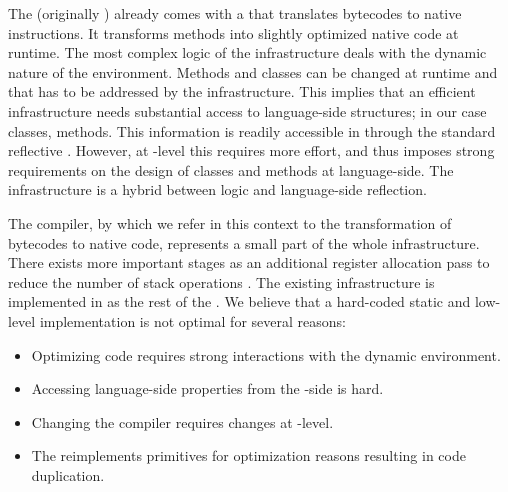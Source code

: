 \noindent The \PH \VM (originally ) already comes with a \JIT that translates bytecodes to native instructions.
It transforms \PH methods into slightly optimized native code at runtime.
The most complex logic of the \JIT infrastructure deals with the dynamic nature of the \PH environment.
Methods and classes can be changed at runtime and that has to be addressed by the \JIT infrastructure.
This implies that an efficient \JIT infrastructure needs substantial access to language-side structures; in our case classes, methods.
This information is readily accessible in \PH through the standard reflective \API.
However, at \VM-level this requires more effort, and thus imposes strong requirements on the design of classes and methods at language-side.
The \JIT infrastructure is a hybrid between \VM logic and language-side reflection.

The \JIT compiler, by which we refer in this context to the transformation of bytecodes to native code, represents a small part of the whole \JIT infrastructure.
There exists more important stages  as an additional register allocation pass to reduce the number of stack operations \cite{Mira99a,Mira11a}.
The existing \JIT infrastructure is implemented in \Slang \cite[Ch.\ 5]{Blac09a} as the rest of the \VM.
We believe that a hard-coded static and low-level implementation is not optimal for several reasons:

\begin{itemize}
	\item Optimizing \PH code requires strong interactions with the dynamic environment.
	
	\item Accessing language-side properties from the \VM-side is hard.
	
	\item Changing the \JIT compiler requires changes at \VM-level.
	
	\item The \JIT reimplements primitives for optimization reasons resulting in code duplication.
\end{itemize}

